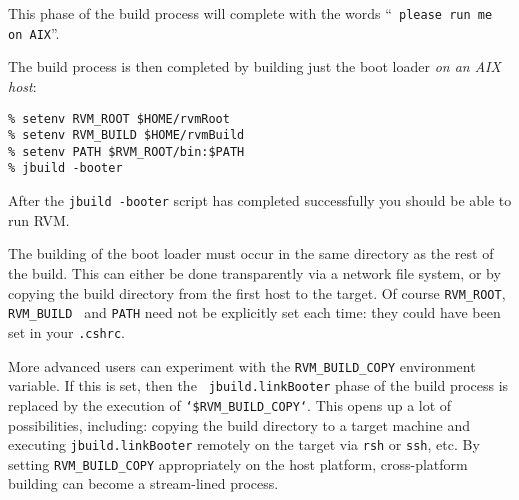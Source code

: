 This phase of the build process will complete with the words ``{\tt
  please run me on AIX}''.


The build process is then completed by building just the boot loader {\em
  on an AIX host}:

\begin{verbatim}
% setenv RVM_ROOT $HOME/rvmRoot
% setenv RVM_BUILD $HOME/rvmBuild
% setenv PATH $RVM_ROOT/bin:$PATH
% jbuild -booter
\end{verbatim}

After the {\tt jbuild -booter} script has completed successfully you should be able 
to run RVM. 

The building of the boot loader must occur in the same directory as
the rest of the build.  This can either be done transparently via a
network file system, or by copying the build directory from the first
host to the target.  Of course {\tt RVM\_ROOT}, {\tt RVM\_BUILD }
and {\tt PATH} need not be explicitly set each time: they could have
been set in your {\tt .cshrc}.

More advanced users can experiment with the {\tt RVM\_BUILD\_COPY}
environment variable.  If this is set, then the {\tt
  jbuild.linkBooter} phase of the build process is replaced by the
execution of {\tt `\$RVM\_BUILD\_COPY`}.  This opens up a lot of
possibilities, including: copying the build directory to a target
machine and executing {\tt jbuild.linkBooter} remotely on the target
via {\tt rsh} or {\tt ssh}, etc.  By setting {\tt RVM\_BUILD\_COPY}
appropriately on the host platform, cross-platform building can become
a stream-lined process.









